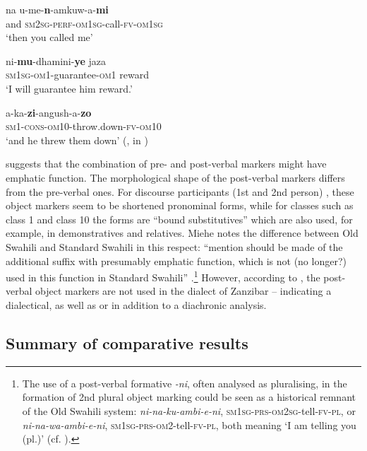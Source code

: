 \documentclass[output=paper]{langscibook}
\begin{document}
    \ea\label{ex:marten:45a} \gll  na   u-me-\textbf{n}{}-amkuw-a-\textbf{mi} \\
    and  \textsc{sm2sg-perf-om1sg}{}-call-\textsc{fv}{}-\textsc{om1sg}\\
    \glt ‘then you called me’ \citep[99]{Miehe1979}

    \ex\label{ex:marten:45b} \gll   ni-\textbf{mu}{}-dhamini-\textbf{ye}         jaza \\
    \textsc{sm1sg-om1}{}-guarantee-\textsc{om}1  reward\\
    \glt ‘I will guarantee him reward.’ \citep[100]{Miehe1979}

    \ex\label{ex:marten:45c} \gll   a-ka-\textbf{zi}{}-angush-a-\textbf{zo} \\
    \textsc{sm}1-\textsc{cons-om10}{}-throw.down-\textsc{fv}{}-\textsc{om10}\\
    \glt ‘and he threw them down’ (\citealt[108]{Steere1884}, in \citealt[101]{Miehe1979})
    \z
\z

\citet[101]{Miehe1979} suggests that the combination of pre- and post-verbal markers might have emphatic function. The morphological shape of the post-verbal markers differs from the pre-verbal ones. For discourse participants (1st and 2nd person) , these object markers seem to be shortened pronominal forms, while for classes such as class 1  and class 10  the forms are ``bound substitutives'' \citep{Schadeberg1992} which are also used, for example, in demonstratives and relatives. Miehe notes the difference between Old Swahili and Standard Swahili in this respect: ``mention should be made of the additional suffix with presumably emphatic function, which is not (no longer?) used in this function in Standard Swahili'' \citep[101]{Miehe1979}.\footnote{The use of a post-verbal formative \textit{{}-ni}, often analysed as pluralising, in the formation of 2nd plural object marking could be seen as a historical remnant of the Old Swahili system:  \textit{ni-na-ku-ambi-e-ni},
    \textsc{sm1sg-prs-om2sg}-tell-\textsc{fv-pl}, or \textit{ni-na-wa-ambi-e-ni}, \textsc{sm1sg-prs-om2}-tell-\textsc{fv-pl}, both meaning ‘I am telling you (pl.)’ (cf. \citealt{GibsonEtAl2019}).} However, according to \citet[108]{Steere1884}, the post-verbal object markers are not used in the dialect of Zanzibar -- indicating a dialectical, as well as or in addition to a diachronic analysis. 

\subsection{Summary of comparative results}\label{sec:marten:3.9}
\end{document}
